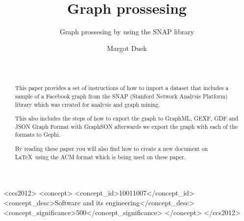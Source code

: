 \documentclass{sig-alternate-05-2015}
\begin{document}

\title{Graph prossesing
}
\subtitle{Graph prossesing by using the SNAP library
}


\author{
\alignauthor
Margot Duek\titlenote{}\\
       \\
       \\
}

\maketitle
\begin{abstract}
This paper provides a set of instructions of how to import a dataset that
includes a sample of a Facebook graph from the SNAP (Stanford Network
Analysis Platform) library which was created for analysis and graph mining.

This also includes the steps of how to export the graph to GraphML, GEXF,
GDF and JSON Graph Format with GraphSON afterwards we export the graph
with each of the formats to Gephi.

By reading these paper you will also find how to create a new document on
\LaTeX\  using the ACM format which is being used on these paper.

\end{abstract}


\begin{CCSXML}
  <ccs2012>
  <concept>
  <concept_id>10011007</concept_id>
  <concept_desc>Software and its engineering</concept_desc>
  <concept_significance>500</concept_significance>
  </concept>
  </ccs2012>
\end{CCSXML}




\end{document}
